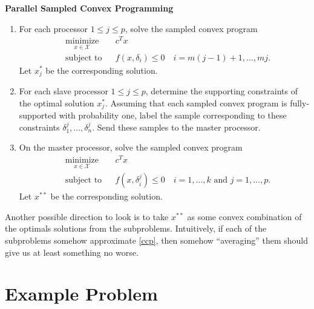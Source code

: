 \documentclass[12pt]{article}
\begin{document}
\textbf{Parallel Sampled Convex Programming}
\begin{enumerate}
\item For each processor $1 \leq j \leq p$, solve the sampled convex program
\begin{equation*}
\begin{aligned}
    & \underset{x \in \mathcal{X}}{\text{minimize}}
    & & c^T x \\
    & \text{subject to}
    & & f(x,\delta_i) \leq 0 \quad i = m(j-1) + 1, \ldots, mj.
\end{aligned}
\end{equation*}
Let $x_j^*$ be the corresponding solution.
\item For each slave processor $1 \leq j \leq p$, determine the supporting constraints of the 
optimal solution $x_j^*$.
Assuming that each sampled convex program is fully-supported with probability one,
label the sample corresponding to these constraints $\delta_1^j, \ldots, \delta_n^j$.
Send these samples to the master processor.
\item On the master processor, solve the sampled convex program
\begin{equation*}
\begin{aligned}
    & \underset{x \in \mathcal{X}}{\text{minimize}}
    & & c^T x \\
    & \text{subject to}
    & & f(x,\delta_i^j) \leq 0 \quad i = 1,\ldots,k \text{ and } j = 1,\ldots,p.
\end{aligned}
\end{equation*}
Let $x^{**}$ be the corresponding solution.
\end{enumerate}

Another possible direction to look is to take $x^{**}$ as some convex combination of the
optimals solutions from the subproblems.  Intuitively, if each of the subproblems somehow
approximate \ref{ccp}, then somehow ``averaging'' them should give us at least something
no worse.

\section*{Example Problem}
\end{document}
